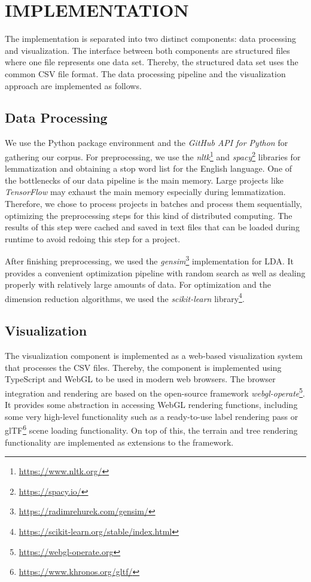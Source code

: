 \documentclass[a4paper,twoside]{article}
\begin{document}
\section{\uppercase{Implementation}}
\label{sec:implementation}
\noindent
The implementation is separated into two distinct components: data processing and visualization.
The interface between both components are structured files where one file represents one data set.
Thereby, the structured data set uses the common CSV file format.
The data processing pipeline and the visualization approach are implemented as follows.

\subsection{Data Processing}
\label{subsec:impldataproc}
\noindent 
We use the Python package environment and the \emph{GitHub API for Python} for gathering our corpus. 
For preprocessing, we use the \emph{nltk}\footnote{\href{https://www.nltk.org/}{https://www.nltk.org/}} and \emph{spacy}\footnote{\href{https://spacy.io/}{https://spacy.io/}} libraries for lemmatization and obtaining a stop word list for the English language.
One of the bottlenecks of our data pipeline is the main memory. 
Large projects like \emph{TensorFlow} may exhaust the main memory especially during lemmatization. 
Therefore, we chose to process projects in batches and process them sequentially, optimizing the preprocessing steps for this kind of distributed computing. 
The results of this step were cached and saved in text files that can be loaded during runtime to avoid redoing this step for a project.

After finishing preprocessing, we used the \emph{gensim}\footnote{\href{https://radimrehurek.com/gensim/}{https://radimrehurek.com/gensim/}} implementation for LDA. 
It provides a convenient optimization pipeline with random search as well as dealing properly with relatively large amounts of data. 
For optimization and the dimension reduction algorithms, we used the \emph{scikit-learn} library\footnote{\href{https://scikit-learn.org/stable/index.html}{https://scikit-learn.org/stable/index.html}}. 

\subsection{Visualization}
\label{subsec:implvis}
\noindent 
The visualization component is implemented as a web-based visualization system that processes the CSV files.
Thereby, the component is implemented using TypeScript and WebGL to be used in modern web browsers. 
The browser integration and rendering are based on the open-source framework \emph{webgl-operate}\footnote{\href{https://webgl-operate.org}{https://webgl-operate.org}}.
It provides some abstraction in accessing WebGL rendering functions, including some very high-level functionality such as a ready-to-use label rendering pass or glTF\footnote{\url{https://www.khronos.org/gltf/}} scene loading functionality.
On top of this, the terrain and tree rendering functionality are implemented as extensions to the framework.
\end{document}
